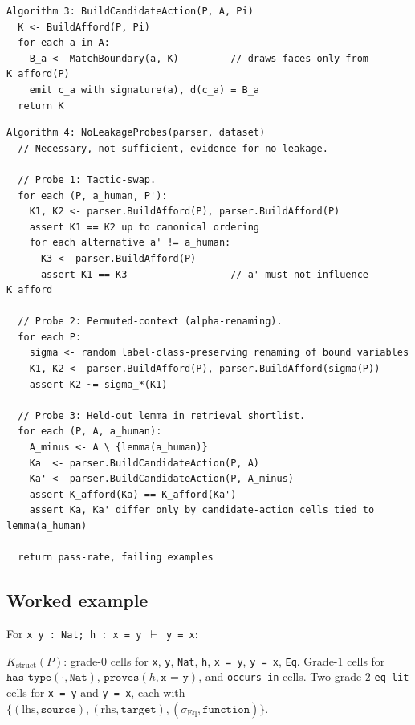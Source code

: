 \documentclass[11pt]{article}
\theoremstyle{definition}
\theoremstyle{plain}
\newcommand{\Kstruct}{K_{\mathrm{struct}}}
\newcommand{\role}[1]{\texttt{#1}}
\begin{document}
\begin{small}
\begin{verbatim}
Algorithm 3: BuildCandidateAction(P, A, Pi)
  K <- BuildAfford(P, Pi)
  for each a in A:
    B_a <- MatchBoundary(a, K)         // draws faces only from K_afford(P)
    emit c_a with signature(a), d(c_a) = B_a
  return K
\end{verbatim}
\end{small}

\begin{small}
\begin{verbatim}
Algorithm 4: NoLeakageProbes(parser, dataset)
  // Necessary, not sufficient, evidence for no leakage.

  // Probe 1: Tactic-swap.
  for each (P, a_human, P'):
    K1, K2 <- parser.BuildAfford(P), parser.BuildAfford(P)
    assert K1 == K2 up to canonical ordering
    for each alternative a' != a_human:
      K3 <- parser.BuildAfford(P)
      assert K1 == K3                  // a' must not influence K_afford

  // Probe 2: Permuted-context (alpha-renaming).
  for each P:
    sigma <- random label-class-preserving renaming of bound variables
    K1, K2 <- parser.BuildAfford(P), parser.BuildAfford(sigma(P))
    assert K2 ~= sigma_*(K1)

  // Probe 3: Held-out lemma in retrieval shortlist.
  for each (P, A, a_human):
    A_minus <- A \ {lemma(a_human)}
    Ka  <- parser.BuildCandidateAction(P, A)
    Ka' <- parser.BuildCandidateAction(P, A_minus)
    assert K_afford(Ka) == K_afford(Ka')
    assert Ka, Ka' differ only by candidate-action cells tied to lemma(a_human)

  return pass-rate, failing examples
\end{verbatim}
\end{small}

\subsection{Worked example}

For \texttt{x y : Nat; h : x = y \(\vdash\) y = x}:

$\Kstruct(P)$: grade-$0$ cells for \texttt{x}, \texttt{y}, \texttt{Nat}, \texttt{h}, \texttt{x = y}, \texttt{y = x}, \texttt{Eq}. Grade-$1$ cells for $\role{has-type}(\cdot, \texttt{Nat})$, $\role{proves}(h, \texttt{x = y})$, and \role{occurs-in} cells. Two grade-$2$ \role{eq-lit} cells for \texttt{x = y} and \texttt{y = x}, each with $\{(\text{lhs}, \role{source}), (\text{rhs}, \role{target}), (\sigma_{\mathrm{Eq}}, \role{function})\}$.
\end{document}
